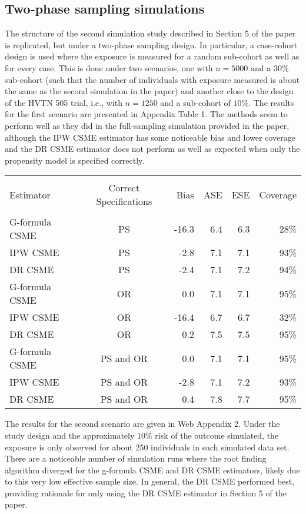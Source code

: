 \documentclass[12pt]{article}
\newcounter{tblcap}
\def\tblhead#1{\hline\\[-9pt]#1\\\hline\\[-9.75pt]}
\def\lastline{\\\hline}
\begin{document}
\subsection{Two-phase sampling simulations}

The structure of the second simulation study described in Section 5 of the paper is replicated, but under a two-phase sampling design. In particular, a case-cohort design is used where the exposure is measured for a random sub-cohort as well as for every case. This is done under two scenarios, one with $n=5000$ and a $30\%$ sub-cohort (such that the number of individuals with exposure measured is about the same as the second simulation in the paper) and another close to the design of the HVTN 505 trial, i.e., with $n=1250$ and a sub-cohort of $10\%$. The results for the first scenario are presented in Appendix Table 1. The methods seem to perform well as they did in the full-sampling simulation provided in the paper, although the IPW CSME estimator has some noticeable bias and lower coverage and the DR CSME estimator does not perform as well as expected  when only the propensity model is specified correctly.

\begin{table}[h]
{\tabcolsep=6.25pt
\begin{tabular}{@{}lcrrrr@{}}
\tblhead{Estimator & Correct Specifications & Bias & ASE & ESE & Coverage}
G-formula CSME & PS & -16.3 & 6.4 & 6.3 & 28\% \\
IPW CSME & PS & -2.8 & 7.1 & 7.1 & 93\% \\
DR CSME & PS & -2.4 & 7.1 & 7.2 & 94\% \\[3pt]
G-formula CSME & OR & 0.0 & 7.1 & 7.1 & 95\% \\
IPW CSME & OR & -16.4 & 6.7 & 6.7 & 32\% \\
DR CSME & OR & 0.2 & 7.5 & 7.5 & 95\% \\[3pt]
G-formula CSME & PS and OR & 0.0 & 7.1 & 7.1 & 95\% \\
IPW CSME & PS and OR & -2.8 & 7.1 & 7.2 & 93\% \\
DR CSME & PS and OR & 0.4 & 7.8 & 7.7 & 95\%
\lastline
\end{tabular}}
\end{table}

The results for the second scenario are given in Web Appendix 2. Under the study design and the approximately $10\%$ risk of the outcome simulated, the exposure is only observed for about $250$ individuals in each simulated data set. There are a noticeable number of simulation runs where the root finding algorithm diverged for the g-formula CSME and DR CSME estimators, likely due to this very low effective sample size. In general, the DR CSME performed best, providing rationale for only using the DR CSME estimator in Section 5 of the paper.
\end{document}
